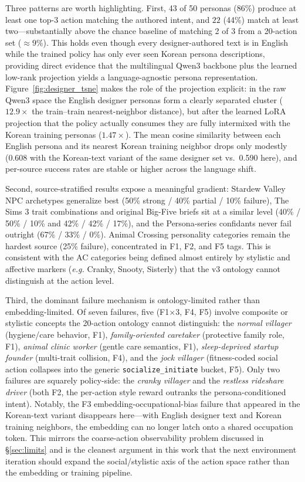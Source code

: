 \documentclass[conference]{IEEEtran}
\newcommand{\eg}{\textit{e.g.}\xspace}
\begin{document}
Three patterns are worth highlighting. First, 43 of 50 personas
(86\%) produce at least one top-3 action matching the authored intent, and
$22$ (44\%) match at least two---substantially above the chance baseline of
matching 2 of 3 from a 20-action set ($\approx\!9\%$). This holds even though
every designer-authored text is in English while the trained policy has only
ever seen Korean persona descriptions, providing direct evidence that the
multilingual Qwen3 backbone plus the learned low-rank projection yields a
language-agnostic persona representation. Figure~\ref{fig:designer_tsne}
makes the role of the projection explicit: in the raw Qwen3 space the English
designer personas form a clearly separated cluster ($12.9\times$ the
train--train nearest-neighbor distance), but after the learned LoRA projection
that the policy actually consumes they are fully intermixed with the Korean
training personas ($1.47\times$). The mean cosine similarity between each
English persona and its nearest Korean training neighbor drops only modestly
(0.608 with the Korean-text variant of the same designer set vs.\ 0.590 here),
and per-source success rates are stable or higher across the language shift.

Second, source-stratified results expose a meaningful gradient: Stardew Valley
NPC archetypes generalize best (50\% strong / 40\% partial / 10\% failure),
The Sims 3 trait combinations and original Big-Five briefs sit at a similar
level (40\% / 50\% / 10\% and 42\% / 42\% / 17\%), and the Persona-series
confidants never fail outright (67\% / 33\% / 0\%). Animal Crossing personality
categories remain the hardest source (25\% failure), concentrated in F1, F2,
and F5 tags. This is consistent with the AC categories being defined almost
entirely by stylistic and affective markers (\eg Cranky, Snooty, Sisterly)
that the v3 ontology cannot distinguish at the action level.

Third, the dominant failure mechanism is ontology-limited rather than
embedding-limited. Of seven failures, five (F1$\times$3, F4, F5) involve
composite or stylistic concepts the 20-action ontology cannot distinguish:
the \emph{normal villager} (hygiene/care behavior, F1),
\emph{family-oriented caretaker} (protective family role, F1),
\emph{animal clinic worker} (gentle care semantics, F1),
\emph{sleep-deprived startup founder} (multi-trait collision, F4), and the
\emph{jock villager} (fitness-coded social action collapses into the generic
\texttt{socialize\_initiate} bucket, F5). Only two failures are squarely
policy-side: the \emph{cranky villager} and the \emph{restless rideshare
driver} (both F2, the per-action style reward outranks the persona-conditioned
intent). Notably, the F3 embedding-occupational-bias failure that appeared
in the Korean-text variant disappears here---with English designer text and
Korean training neighbors, the embedding can no longer latch onto a shared
occupation token. This mirrors the coarse-action observability problem
discussed in \S\ref{sec:limits} and is the cleanest argument in this work
that the next environment iteration should expand the social/stylistic axis
of the action space rather than the embedding or training pipeline.
\end{document}
